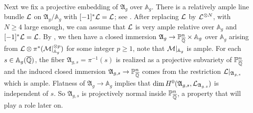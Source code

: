 



Next we fix a projective embedding of $\mathfrak{A}_g$ over
$\mathbb{A}_g$.
There is a relatively ample line bundle
${\mathcal L}$ on $\mathfrak{A}_g/\mathbb{A}_g$ with $[-1]^*{\mathcal L} = {\mathcal L}$; see
\cite[Th\'{e}or\`{e}me~XI~1.4]{LNM119}. 
After replacing ${\mathcal L}$
by ${\mathcal L}^{\otimes N}$, with $N\ge 4$ large enough, we can assume that
${\mathcal L}$ is very ample relative over $\mathbb{A}_g$ and $[-1]^*{\mathcal L}={\mathcal L}$.
By \cite[Proposition~4.4.10(ii) and Proposition~4.1.4]{EGAII}, we
then have a closed immersion $\mathfrak{A}_g \rightarrow
{\mathbb{P}}^n_{{\overline{\mathbb{Q}}}} \times \mathbb{A}_g$ over $\mathbb{A}_g$
arising from ${\mathcal L} \otimes
\pi^*({\mathcal M}|_{\mathbb{A}_g}^{\otimes p})$
for some integer $p\ge 1$, note that ${\mathcal M}|_{\mathbb{A}_g}$ is ample.
For each $s \in \mathbb{A}_g({\overline{\mathbb{Q}}})$, the fiber
$\mathfrak{A}_{g,s}=\pi^{-1}(s)$ is realized as a
projective subvariety of ${\mathbb{P}}^n_{\overline{\mathbb{Q}}}$ and the induced
closed immersion $\mathfrak{A}_{g,s}\rightarrow{\mathbb{P}}^n_{\overline{\mathbb{Q}}}$ comes
from the restriction ${\mathcal L}|_{\mathfrak{A}_{g,s}}$ which is ample.
Flatness of $\mathfrak{A}_g\rightarrow\mathbb{A}_g$
implies that
$\dim H^0(\mathfrak{A}_{g,s},{\mathcal L}_{\mathfrak{A}_{g.s}})$ is independent of $s$.
So $\mathfrak{A}_{g,s}$ is projectively
normal inside ${\mathbb{P}}^n_{\overline{\mathbb{Q}}}$, a property that will play a role later on. 
